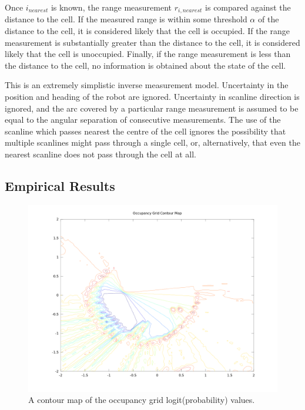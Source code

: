 \documentclass[11pt]{article} %
\begin{document}
Once $i_{nearest}$ is known, the range measurement $r_{i,nearest}$ is compared against the distance to the cell.  If the measured range is within some threshold $\alpha$ of the distance to the cell, it is considered likely that the cell is occupied.  If the range measurement is substantially greater than the distance to the cell, it is considered likely that the cell is unoccupied.  Finally, if the range measurement is less than the distance to the cell, no information is obtained about the state of the cell.

This is an extremely simplistic inverse measurement model.  Uncertainty in the position and heading of the robot are ignored.  Uncertainty in scanline direction is ignored, and the arc covered by a particular range measurement is assumed to be equal to the angular separation of consecutive measurements.  The use of the scanline which passes nearest the centre of the cell ignores the possibility that multiple scanlines might pass through a single cell, or, alternatively, that even the nearest scanline does not pass through the cell at all.  

\subsection{Empirical Results}

\begin{figure}[hbt]
 \centering
 \includegraphics[scale=0.38]{ContourMap.png}
 \caption{A contour map of the occupancy grid logit(probability) values.}
 \label{contour}
\end{figure}
\end{document}
